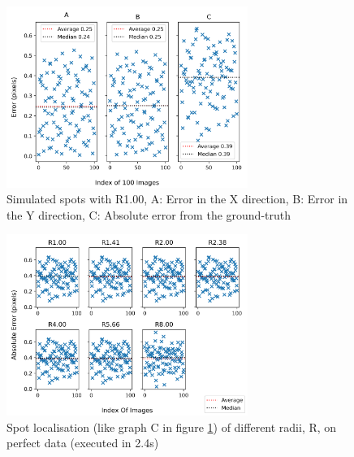 \documentclass[aps,pra,a4paper,nofootinbib,onecolumn,tightenlines,longbibliography,12pt,amsfonts,amssymb,amsmath,floatfix]{revtex4-2} %
\begin{document}
  \begin{figure}[H]
      \begin{center}
        \includegraphics[width=0.7\textwidth]{project_pics/single_test.png}
      \end{center}
      \caption{Simulated spots with R1.00, A: Error in the X direction, B: Error in the Y direction, C: Absolute error from the ground-truth}
      \label{fig:single_test}
    \end{figure}

  \begin{figure}[H]
    \begin{center}
      \includegraphics[width=0.7\textwidth]{project_pics/no_noise_all_r.png}
    \end{center}
    \caption{Spot localisation (like graph C in figure \ref{fig:single_test}) of different radii, R, on perfect data (executed in 2.4s)}
    \label{fig:no_noise_all_r}
  \end{figure}
\end{document}
